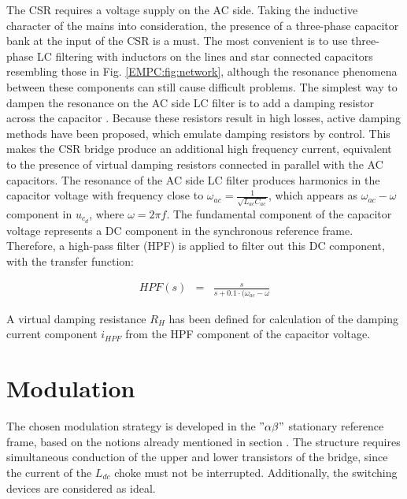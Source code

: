     The CSR requires a voltage supply on the AC side. Taking the inductive character of the mains into consideration, the presence of a three-phase capacitor bank at the input of the CSR is a must. The most convenient is to use three-phase LC filtering with inductors on the lines and star connected capacitors resembling those in Fig. \ref{EMPC:fig:network}, although the resonance phenomena between these components can still cause difficult problems. The simplest way to dampen the resonance on the AC side LC filter is to add a damping resistor across the capacitor \cite{regaya2014new}. Because these resistors result in high losses, active damping methods have been proposed, which emulate damping resistors by control. This makes the CSR bridge produce an additional high frequency current, equivalent to the presence of virtual damping resistors connected in parallel with the AC capacitors. The resonance of the AC side LC filter produces harmonics in the capacitor voltage with frequency close to $\omega_{ac}=\frac{1}{\sqrt{L_{ac}C_{ac}}}$, which appears as $\omega_{ac}-\omega$ component in $u_{c_d}$, where $\omega=2\pi f$. The fundamental component of the capacitor voltage represents a DC component in the synchronous reference frame. Therefore, a high-pass filter (HPF) is applied to filter out this DC component, with the transfer function:

    \begin{equation}
        \begin{array}{rcl}
            HPF(s)&=&\frac{s}{s+0.1\cdot(\omega_{ac}-\omega}
        \end{array}
        \label{EMPC:equ:AC_HPF}
    \end{equation}

    A virtual damping resistance $R_H$ has been defined for calculation of the damping current component $i_{HPF}$ from the HPF component of the capacitor voltage.

\section{Modulation}\label{EMPC:sec:Modulation}

    The chosen modulation strategy is developed in the $"\alpha\beta"$ stationary reference frame, based on the notions already mentioned in section . The structure requires simultaneous conduction of the upper and lower transistors of the bridge, since the current of the $L_{dc}$  choke must not be interrupted. Additionally, the switching devices are considered as ideal.

